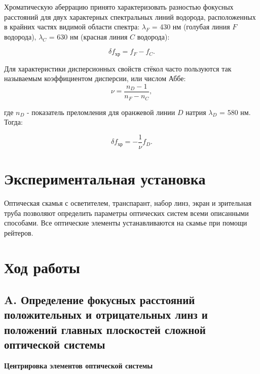 \documentclass[12pt,a4paper]{article}
\begin{document}
	Хроматическую аберрацию принято характеризовать разностью фокусных расстояний для двух характерных спектральных линий водорода, расположенных в крайних частях видимой области спектра: $\lambda_F$ = 430 нм (голубая линия $F$ водорода), $\lambda_C$ = 630 нм (красная линия $C$ водорода):

	\begin{equation}
		\delta f_{\text{хр}} = f_F - f_C.
        \label{eq:9}
	\end{equation}

	Для характеристики дисперсионных свойств стёкол часто пользуются так называемым коэффициентом дисперсии, или числом Аббе:
	\begin{equation}
		\nu = \frac{n_D - 1}{n_F - n_C},
	\end{equation}

	где $n_D$ - показатель преломления для оранжевой линии $D$ натрия $\lambda_D$ = 580 нм.
	Тогда:

	\begin{equation}
		\delta f_{\text{хр}} = -\frac{1}{\nu} f_D.
        \label{eq:11}
	\end{equation}


	\section*{Экспериментальная установка}

    Оптическая скамья с осветителем, транспарант, набор линз, экран и зрительная труба позволяют определить параметры оптических систем всеми описанными способами. Все оптические элементы устанавливаются на скамье при помощи рейтеров.


    \section*{Ход работы}

\subsection*{A. Определение фокусных расстояний положительных и отрицательных линз и положений главных плоскостей сложной оптической системы}
	
	\begin{center}
		\textbf{Центрировка элементов оптической системы}
	\end{center}
\end{document}
